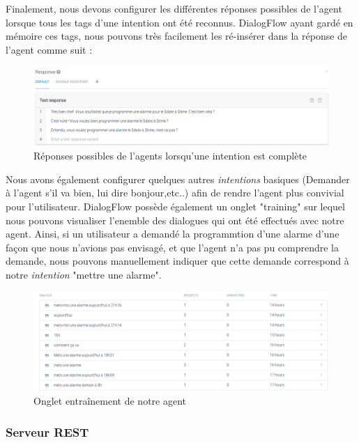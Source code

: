 Finalement, nous devons configurer les différentes réponses possibles de l'agent lorsque tous les tags d'une intention ont été reconnus. DialogFlow ayant gardé en mémoire 
ces tags, nous pouvons très facilement les ré-insérer dans la réponse de l'agent comme suit : 

\begin{figure}[H]
    \centering
        \centering
        \includegraphics[width=1.2\textwidth]{images/answer.png}
        \caption{Réponses possibles de l'agents lorsqu'une intention est complète}
\end{figure}

Nous avons également configurer quelques autres \emph{intentions} basiques (Demander à l'agent s'il va bien, lui dire bonjour,etc..) afin de rendre l'agent plus convivial 
pour l'utilisateur. DialogFlow possède également un onglet "training" sur lequel nous pouvons visualiser l'enemble des dialogues qui ont été effectués avec notre agent. Ainsi,
si un utilisateur a demandé la programmtion d'une alarme d'une façon que nous n'avions pas envisagé, et que l'agent n'a pas pu comprendre la demande, nous pouvons 
manuellement indiquer que cette demande correspond à notre \emph{intention} "mettre une alarme".

\begin{figure}[H]
    \centering
        \centering
        \includegraphics[width=1.2\textwidth]{images/training.png}
        \caption{Onglet entraînement de notre agent}
\end{figure}


\subsubsection{Serveur REST}


